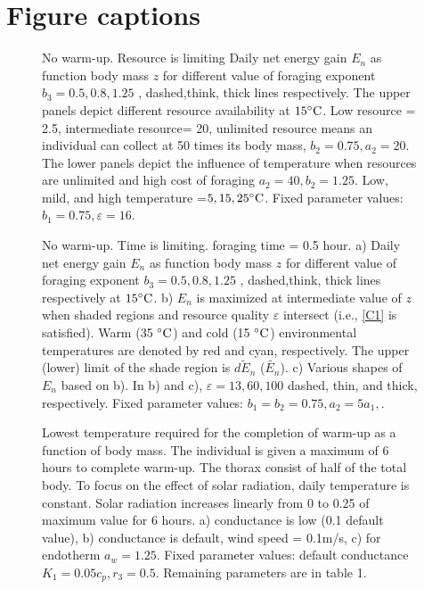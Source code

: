 \section*{Figure captions}
\begin{figure}[H]
\begin{center}
\caption{
	No warm-up. Resource is limiting
	Daily net energy gain  $E_n$ as function body mass $z$ for different value of foraging exponent $b_3 = 0.5,0.8, 1.25$ , dashed,think, thick lines respectively.
	The upper panels depict different resource availability at $15 ^{\circ} \rm{C}$. 
	Low resource = 2.5, intermediate resource= 20, unlimited resource means an individual can collect at 50 times its body mass, $b_2 = 0.75, a_2 = 20$. 
	The lower panels depict the influence of temperature when resources are unlimited and high cost of foraging $a_2 = 40, b_2  = 1.25$.
	Low, mild, and high temperature =$5, 15, 25 ^{\circ} \rm{C}$.
	Fixed parameter values: $b_1 = 0.75, \varepsilon = 16$.
}
\label{fig1}
\end{center}
\end{figure}
\vspace{-1.5cm}
%
\begin{figure}[H]
\begin{center}
\caption{
	No warm-up. Time is limiting. foraging time = 0.5 hour.
	a) Daily net energy gain  $E_n$ as function body mass $z$ for different value of foraging exponent $b_3 = 0.5,0.8, 1.25$ , dashed,think, thick lines respectively  at $15 ^{\circ} \rm{C}$.
	b)  $E_n$ is maximized at intermediate value of $z$  when shaded regions and resource quality $\varepsilon$ intersect (i.e., \cref{C1} is satisfied).
	Warm (35 $^{\circ} \rm{C}$) and cold (15 $^{\circ} \rm{C}$) environmental temperatures are denoted by red and cyan, respectively.
	The upper (lower) limit of the shade region is $\widetilde{dE_n}$ ($\widetilde{E_n}$).  
	c) Various shapes of $E_n$ based on b).
	In b) and c), $\varepsilon = 13, 60, 100$ dashed, thin, and thick, respectively.
	Fixed parameter values: $b_1 = b_2 = 0.75, a_2 = 5 a_1, $.
}
\label{fig2}
\end{center}
\end{figure}
\vspace{-1.5cm}
%
\begin{figure}[H]
\begin{center}
\caption{
	Lowest temperature required for the completion of warm-up as a function of body mass.
	The individual is given a maximum of 6 hours to complete warm-up.
	The thorax consist of half of the total body.
	To focus on the effect of solar radiation, daily temperature is constant.
	Solar radiation increases linearly from 0 to 0.25 of maximum value for 6 hours. 
	a) conductance is low (0.1 default value), b) conductance is default, wind speed  = 0.1m/s, c) for endotherm $a_w = 1.25$. 
	Fixed parameter values: default conductance $K_1 = 0.05 c_p, r_3 = 0.5$.
	Remaining parameters are in table 1.
}%
\label{fig3}
\end{center}
\end{figure}
